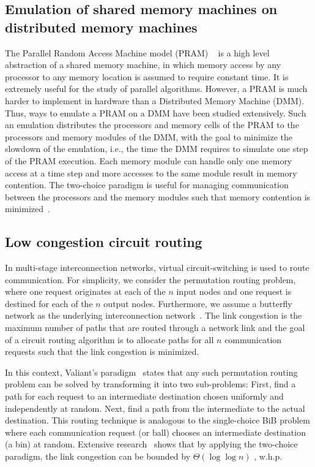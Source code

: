 \documentclass[a4paper,12pt]{article}
\begin{document}
\subsection{Emulation of shared memory machines on distributed memory machines}
\label{sec:DMM}
The Parallel Random Access Machine model (PRAM) ~\cite{P03} is a high level abstraction of a shared memory machine, in which memory access by any processor to any memory location is assumed to require constant time. It is extremely useful for the study of parallel algorithms. However, a PRAM is much harder to implement in hardware than a Distributed Memory Machine (DMM). Thus, ways to emulate a PRAM on a DMM have been studied extensively. Such an emulation distributes the processors and memory cells of the PRAM to the processors and memory modules of the DMM, with the goal to minimize the slowdown of the emulation, i.e., the time the DMM requires to simulate one step of the PRAM execution. Each memory module can handle only one memory access at a time step and more accesses to the same module result in memory contention. The two-choice paradigm is useful for managing communication between the processors and the memory modules such that memory contention is minimized~\cite{KLM92}.
 
\subsection{Low congestion circuit routing}
\label{sec:circuitrouting}
In multi-stage interconnection networks, virtual circuit-switching is used to route communication. For simplicity, we consider the permutation routing problem, where one request originates at each of the $n$ input nodes and one request is destined for each of the $n$ output nodes. Furthermore, we assume a butterfly network as the underlying interconnection network~\cite{CLR09}. The link congestion is the maximum number of paths that are routed through a network link and the goal of a circuit routing algorithm is to allocate paths for all $n$ communication requests such that the link congestion is minimized.

In this context, Valiant's paradigm~\cite{V82} states that any such permutation routing problem can be solved by transforming it into two sub-problems: First, find a path for each request to an intermediate destination chosen uniformly and independently at random. Next, find a path from the intermediate to the actual destination. This routing technique is analogous to the single-choice BiB problem where each communication request (or ball) chooses an intermediate destination (a bin) at random.
Extensive research~\cite{CMM+98,MRS01} shows that by applying the two-choice paradigm, the link congestion can be bounded by $\Theta\left(\log \log n\right)$ , w.h.p.
\end{document}
